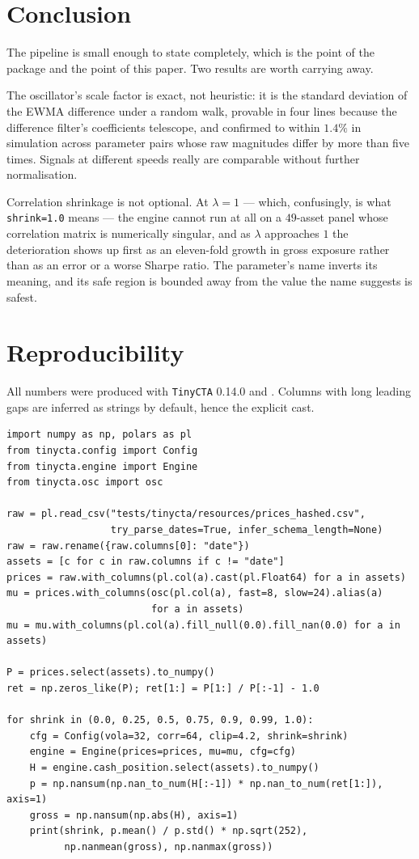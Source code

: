 \documentclass[11pt,a4paper]{article}
\newcommand{\code}[1]{\texttt{#1}}
\begin{document}
\section{Conclusion}

The pipeline is small enough to state completely, which is the point of the
package and the point of this paper. Two results are worth carrying away.

The oscillator's scale factor is exact, not heuristic: it is the standard
deviation of the EWMA difference under a random walk, provable in four lines
because the difference filter's coefficients telescope, and confirmed to within
$1.4\%$ in simulation across parameter pairs whose raw magnitudes differ by more
than five times. Signals at different speeds really are comparable without
further normalisation.

Correlation shrinkage is not optional. At $\lambda = 1$ --- which, confusingly,
is what \code{shrink=1.0} means --- the engine cannot run at all on a $49$-asset
panel whose correlation matrix is numerically singular, and as $\lambda$
approaches $1$ the deterioration shows up first as an eleven-fold growth in gross
exposure rather than as an error or a worse Sharpe ratio. The parameter's name
inverts its meaning, and its safe region is bounded away from the value the name
suggests is safest.

\appendix

\section{Reproducibility}
\label{app:repro}

All numbers were produced with \code{TinyCTA} 0.14.0 and
. Columns with long leading gaps
are inferred as strings by default, hence the explicit cast.

\begin{verbatim}
import numpy as np, polars as pl
from tinycta.config import Config
from tinycta.engine import Engine
from tinycta.osc import osc

raw = pl.read_csv("tests/tinycta/resources/prices_hashed.csv",
                  try_parse_dates=True, infer_schema_length=None)
raw = raw.rename({raw.columns[0]: "date"})
assets = [c for c in raw.columns if c != "date"]
prices = raw.with_columns(pl.col(a).cast(pl.Float64) for a in assets)
mu = prices.with_columns(osc(pl.col(a), fast=8, slow=24).alias(a)
                         for a in assets)
mu = mu.with_columns(pl.col(a).fill_null(0.0).fill_nan(0.0) for a in assets)

P = prices.select(assets).to_numpy()
ret = np.zeros_like(P); ret[1:] = P[1:] / P[:-1] - 1.0

for shrink in (0.0, 0.25, 0.5, 0.75, 0.9, 0.99, 1.0):
    cfg = Config(vola=32, corr=64, clip=4.2, shrink=shrink)
    engine = Engine(prices=prices, mu=mu, cfg=cfg)
    H = engine.cash_position.select(assets).to_numpy()
    p = np.nansum(np.nan_to_num(H[:-1]) * np.nan_to_num(ret[1:]), axis=1)
    gross = np.nansum(np.abs(H), axis=1)
    print(shrink, p.mean() / p.std() * np.sqrt(252),
          np.nanmean(gross), np.nanmax(gross))
\end{verbatim}
\end{document}
